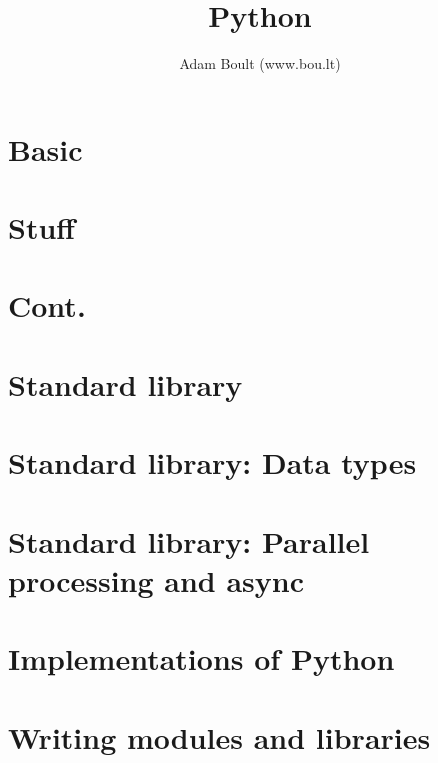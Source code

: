 \documentclass[oneside]{book}
\begin{document}
\author{Adam Boult (www.bou.lt)}
\title{Python}
\maketitle

\setcounter{tocdepth}{0}
\tableofcontents



\part{Basic}







\part{Stuff}




\part{Cont.}





\part{Standard library}












\part{Standard library: Data types}


\part{Standard library: Parallel processing and async}


\part{Implementations of Python}


\part{Writing modules and libraries}


\end{document}
